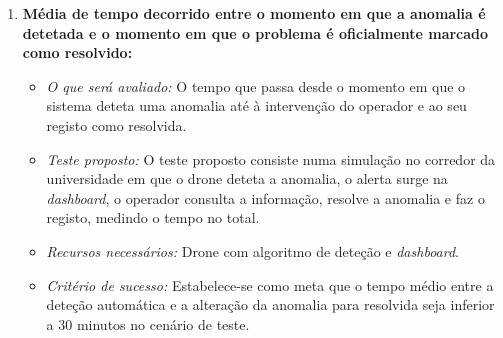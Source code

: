 \documentclass[conference,a4paper]{IEEEtran}
\begin{document}
\begin{enumerate}
  \item \textbf{Média de tempo decorrido entre o momento em que a anomalia é detetada e o momento em que o problema é oficialmente marcado como resolvido:}
    \begin{itemize}
        \item \textit{O que será avaliado:} O tempo que passa desde o momento em que o sistema deteta uma anomalia até à intervenção do operador e ao seu registo como resolvida.
        \item \textit{Teste proposto:} O teste proposto consiste numa simulação no corredor da universidade em que o drone deteta a anomalia, o alerta surge na \textit{dashboard}, o operador consulta a informação, resolve a anomalia e faz o registo, medindo o tempo no total.
        \item \textit{Recursos necessários:} Drone com algoritmo de deteção e \textit{dashboard}.
        \item \textit{Critério de sucesso:} Estabelece-se como meta que o tempo médio entre a deteção automática e a alteração da anomalia para resolvida seja inferior a 30 minutos no cenário de teste.
    \end{itemize}
\end{enumerate}
\end{document}
